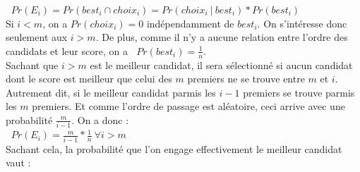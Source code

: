 \documentclass[a4paper,10pt]{article}
\begin{document}
\begin{math}\;\;Pr(E_i) = Pr(best_i \cap choix_i) = Pr(choix_i\ |\ best_i) * Pr(best_i)\end{math}\\

Si
\begin{math}i < m\end{math},
on a
\begin{math}Pr(choix_i) = 0\end{math}
indépendamment de
\begin{math}best_i\end{math}.
On s'intéresse donc seulement aux
\begin{math}i > m\end{math}.
De plus, comme il n'y a aucune relation entre l'ordre des candidats et leur score, on a
\begin{math}\;\;Pr(best_i) = \frac{1}{n}\end{math}.\\

Sachant que
\begin{math}i > m\end{math}
est le meilleur candidat, il sera sélectionné si aucun candidat dont le score est meilleur que celui des
\begin{math}m\end{math}
premiers ne se trouve entre
\begin{math}m\end{math}
et
\begin{math}i\end{math}.
Autrement dit, si le meilleur candidat parmis les
\begin{math}i - 1\end{math}
premiers se trouve parmis les
\begin{math}m\end{math}
premiers. Et comme l'ordre de passage est aléatoire, ceci arrive avec une probabilité
\begin{math}\frac{m}{i-1}\end{math}.
On a donc :\\

\begin{math}\;\;Pr(E_i) = \frac{m}{i-1} * \frac{1}{n}\ \forall i > m\end{math}\\

Sachant cela, la probabilité que l'on engage effectivement le meilleur candidat vaut :\\
\end{document}
